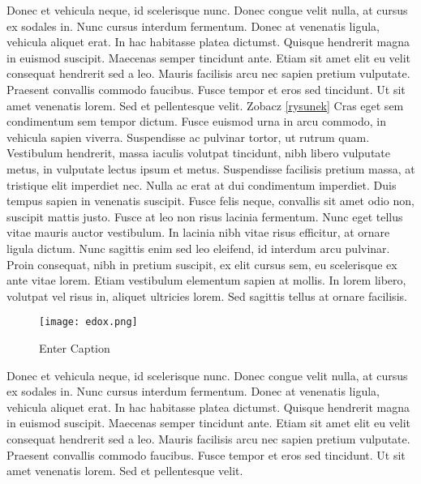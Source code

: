 \documentclass[12pt]{article}
\begin{document}
Donec et vehicula neque, id scelerisque nunc. Donec congue velit nulla, at cursus ex sodales in. Nunc cursus interdum fermentum. Donec at venenatis ligula, vehicula aliquet erat. In hac habitasse platea dictumst. Quisque hendrerit magna in euismod suscipit. Maecenas semper tincidunt ante. Etiam sit amet elit eu velit consequat hendrerit sed a leo. Mauris facilisis arcu nec sapien pretium vulputate. Praesent convallis commodo faucibus. Fusce tempor et eros sed tincidunt. Ut sit amet venenatis lorem. Sed et pellentesque velit. 
Zobacz \ref{rysunek}
 Cras eget sem condimentum sem tempor dictum. Fusce euismod urna in arcu commodo, in vehicula sapien viverra. Suspendisse ac pulvinar tortor, ut rutrum quam. Vestibulum hendrerit, massa iaculis volutpat tincidunt, nibh libero vulputate metus, in vulputate lectus ipsum et metus. Suspendisse facilisis pretium massa, at tristique elit imperdiet nec. Nulla ac erat at dui condimentum imperdiet. Duis tempus sapien in venenatis suscipit. Fusce felis neque, convallis sit amet odio non, suscipit mattis justo. Fusce at leo non risus lacinia fermentum. Nunc eget tellus vitae mauris auctor vestibulum. In lacinia nibh vitae risus efficitur, at ornare ligula dictum. Nunc sagittis enim sed leo eleifend, id interdum arcu pulvinar. Proin consequat, nibh in pretium suscipit, ex elit cursus sem, eu scelerisque ex ante vitae lorem. Etiam vestibulum elementum sapien at mollis. In lorem libero, volutpat vel risus in, aliquet ultricies lorem. Sed sagittis tellus at ornare facilisis.

 
\begin{figure}
    \centering
    \texttt{[image: edox.png]}
    \caption{Enter Caption}
    \label{fig:rysunek2}
\end{figure}
Donec et vehicula neque, id scelerisque nunc. Donec congue velit nulla, at cursus ex sodales in. Nunc cursus interdum fermentum. Donec at venenatis ligula, vehicula aliquet erat. In hac habitasse platea dictumst. Quisque hendrerit magna in euismod suscipit. Maecenas semper tincidunt ante. Etiam sit amet elit eu velit consequat hendrerit sed a leo. Mauris facilisis arcu nec sapien pretium vulputate. Praesent convallis commodo faucibus. Fusce tempor et eros sed tincidunt. Ut sit amet venenatis lorem. Sed et pellentesque velit. 
\end{document}
